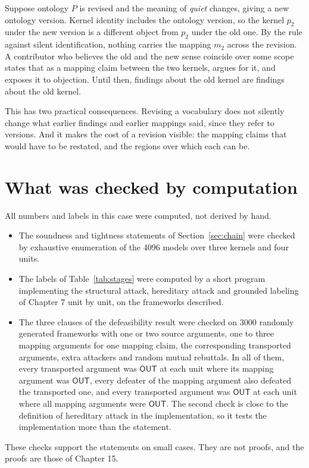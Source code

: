 \documentclass[11pt]{article}
\newcommand{\OUT}{\textsf{OUT}}
\begin{document}
Suppose ontology $P$ is revised and the meaning of \emph{quiet} changes, giving a new ontology version. Kernel identity includes the ontology version, so the kernel $p_2$ under the new version is a different object from $p_2$ under the old one. By the rule against silent identification, nothing carries the mapping $m_2$ across the revision. A contributor who believes the old and the new sense coincide over some scope states that as a mapping claim between the two kernels, argues for it, and exposes it to objection. Until then, findings about the old kernel are findings about the old kernel.

This has two practical consequences. Revising a vocabulary does not silently change what earlier findings and earlier mappings said, since they refer to versions. And it makes the cost of a revision visible: the mapping claims that would have to be restated, and the regions over which each can be.

\section{What was checked by computation}\label{sec:checks}

All numbers and labels in this case were computed, not derived by hand.
\begin{itemize}[nosep]
\item The soundness and tightness statements of Section~\ref{sec:chain} were checked by exhaustive enumeration of the 4096 models over three kernels and four units.
\item The labels of Table~\ref{tab:stages} were computed by a short program implementing the structural attack, hereditary attack and grounded labeling of Chapter 7 unit by unit, on the frameworks described.
\item The three clauses of the defeasibility result were checked on 3000 randomly generated frameworks with one or two source arguments, one to three mapping arguments for one mapping claim, the corresponding transported arguments, extra attackers and random mutual rebuttals. In all of them, every transported argument was $\OUT$ at each unit where its mapping argument was $\OUT$, every defeater of the mapping argument also defeated the transported one, and every transported argument was $\OUT$ at each unit where all mapping arguments were $\OUT$. The second check is close to the definition of hereditary attack in the implementation, so it tests the implementation more than the statement.
\end{itemize}
These checks support the statements on small cases. They are not proofs, and the proofs are those of Chapter 15.
\end{document}

